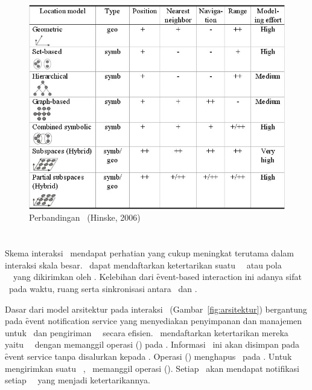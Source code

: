 \begin{figure}
    \centering
    \includegraphics[scale=0.5]
        {pics/location-model-comparison.jpg}
    \caption{Perbandingan \locationmodel~(Hinske, 2006)}
\label{fig:location-model}
\end{figure}

\section{\PubSub}

Skema interaksi \pubsub~mendapat perhatian yang cukup meningkat terutama dalam
interaksi skala besar. \Subscriber~dapat mendaftarkan ketertarikan suatu
\event~\pubsub~atau pola \event~\pubsub~yang dikirimkan oleh \publisher.
Kelebihan dari \f{event-based interaction} ini adanya sifat \decoupling~pada
waktu, ruang serta sinkronisasi antara \publisher~dan \subscriber.

Dasar dari model arsitektur pada interaksi
\pubsub~(Gambar~\ref{fig:arsitektur}) bergantung pada \f{event notification
service} yang menyediakan penyimpanan dan manajemen untuk \subscription~dan
pengiriman \event~\pubsub~secara efisien. \Subscriber~mendaftarkan ketertarikan
mereka yaitu \event~\pubsub~dengan memanggil operasi \subscribe() pada
\eventservice. Informasi \subscription~ini akan disimpan pada \f{event service}
tanpa disalurkan kepada \publisher. Operasi \unsubscribe() menghapus
\subscription~pada \eventservice. Untuk mengirimkan suatu \event~\pubsub,
\publisher~memanggil operasi \publish(). Setiap \subscriber~akan mendapat
notifikasi setiap \event~\pubsub~yang menjadi ketertarikannya.

